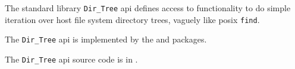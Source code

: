 
The standard library {\tt Dir\_Tree} api defines access to 
functionality to do simple iteration 
over host file system directory trees, vaguely like posix {\tt find}.

The {\tt Dir\_Tree} api is implemented by the 
 and 
 packages.

The {\tt Dir\_Tree} api source code is in .






